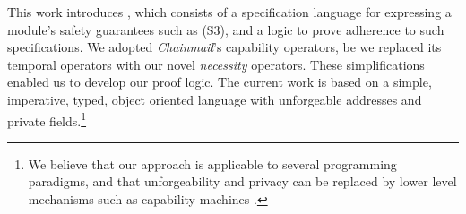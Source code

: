 This work introduces \Nec, which consists of a specification language for expressing a module's safety guarantees such as (S3), and a logic 
to prove adherence to such specifications.
We adopted %
\emph{Chainmail}'s %
  capability operators, 
  be we replaced its temporal operators with  {our novel}
  \emph{necessity} operators. 
  These simplifications enabled us to develop our proof logic. 
The current work is based on a simple, imperative, typed, object oriented
language with unforgeable addresses and private fields.\footnote{We believe
 that our approach is applicable to several programming paradigms, and 
 that   unforgeability and privacy
 can be replaced 
 by lower level mechanisms such as capability machines \cite{vanproving,davis2019cheriabi}.
  }


 

